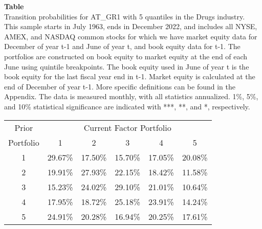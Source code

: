 \begin{table*}[ht!]
\raggedright
{}
\label{tab: transition_probs_AT_GR1_Drugs_with_5_quantiles}
\textbf{Table \thetable} \\
Transition probabilities for AT_GR1 with 5 quantiles in the Drugs industry. \\
\hspace*{1em}This sample starts in July 1963, ends in December 2022, and includes all NYSE, AMEX, and NASDAQ common stocks for which we have market equity data for December of year t-1 and June of year t, and book equity data for t-1. The portfolios are constructed on book equity to market equity at the end of each June using quintile breakpoints.  The book equity used in June of year t is the book equity for the last fiscal year end in t-1.  Market equity is calculated at the end of December of year t-1.  More specific definitions can be found in the Appendix.  The data is measured monthly, with all statistics annualized.  1\%, 5\%, and 10\% statistical significance are indicated with ***, **, and *, respectively. \\
\vspace{0.5em}
\centering
\begin{adjustbox}{max width=\textwidth}
\begin{tabular}{@{}cccccc@{}}
\toprule
Prior & \multicolumn{5}{c}{Current Factor Portfolio} \\
Portfolio & 1 & 2 & 3 & 4 & 5 \\
\midrule
1 & 29.67\% & 17.50\% & 15.70\% & 17.05\% & 20.08\% \\
2 & 19.91\% & 27.93\% & 22.15\% & 18.42\% & 11.58\% \\
3 & 15.23\% & 24.02\% & 29.10\% & 21.01\% & 10.64\% \\
4 & 17.95\% & 18.72\% & 25.18\% & 23.91\% & 14.24\% \\
5 & 24.91\% & 20.28\% & 16.94\% & 20.25\% & 17.61\% \\
\bottomrule
\end{tabular}
\end{adjustbox}
\end{table*}